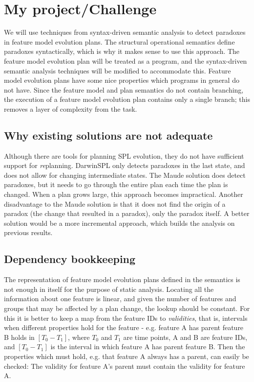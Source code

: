 \documentclass[a4paper,english]{ifimaster}
\begin{document}
\chapter{My project/Challenge}
\label{cha:challenge}

We will use techniques from syntax-driven semantic analysis to detect paradoxes in feature model evolution plans. The structural operational semantics define paradoxes syntactically, which is why it makes sense to use this approach. The feature model evolution plan will be treated as a program, and the syntax-driven semantic analysis techniques will be modified to accommodate this. Feature model evolution plans have some nice properties which programs in general do not have. Since the feature model and plan semantics do not contain branching, the execution of a feature model evolution plan contains only a single branch; this removes a layer of complexity from the task. 

\section{Why existing solutions are not adequate}%
\label{sec:why-existing-solutions-are-not-adequate}
Although there are tools for planning SPL evolution, they do not have sufficient support for \emph{re}planning. DarwinSPL only detects paradoxes in the last state, and does not allow for changing intermediate states. The Maude solution does detect paradoxes, but it needs to go through the entire plan each time the plan is changed. When a plan grows large, this approach becomes impractical. Another disadvantage to the Maude solution is that it does not find the origin of a paradox (the change that resulted in a paradox), only the paradox itself. A better solution would be a more incremental approach, which builds the analysis on previous results.

\section{Dependency bookkeeping}%
\label{sec:dependency-bookkeeping}
The representation of feature model evolution plans defined in the semantics is not enough in itself for the purpose of static analysis. Locating all the information about one feature is linear, and given the number of features and groups that may be affected by a plan change, the lookup should be constant. For this it is better to keep a map from the feature IDs to \emph{validities}, that is, intervals when different properties hold for the feature - e.g. feature A has parent feature B holds in $[T_0 - T_1]$, where $T_0$ and $T_1$ are time points, A and B are feature IDs, and  $[T_0 - T_1]$ is the interval in which feature A has parent feature B. Then the properties which must hold, e.g. that feature A always has a parent, can easily be checked: The validity for feature A's parent must contain the validity for feature A. 
\end{document}
